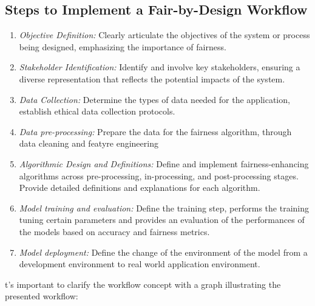 \subsection{Steps to Implement a Fair-by-Design Workflow}
\label{subsection:steps}

\begin{enumerate}

    \item \emph{Objective Definition:} Clearly articulate the objectives of the system or process being designed, emphasizing the importance of fairness.

    \item \emph{Stakeholder Identification:} Identify and involve key stakeholders, ensuring a diverse representation that reflects the potential impacts of the system.

    \item \emph{Data Collection:} Determine the types of data needed for the application, establish ethical data collection protocols.

    \item \emph{Data pre-processing:} Prepare the data for the fairness algorithm, through data cleaning and featyre engineering
    
    \item \emph{Algorithmic Design and Definitions:} Define and implement fairness-enhancing algorithms across pre-processing, in-processing, and post-processing stages. Provide detailed definitions and explanations for each algorithm.

    \item \emph{Model training and evaluation:} Define the training step, performs the training tuning certain parameters and provides an evaluation of the performances of the models based on accuracy and fairness metrics.

    \item \emph{Model deployment:} Define the change of the environment of the model from a development environment to real world application environment.

\end{enumerate}

t's important to clarify the workflow concept with a graph illustrating the presented workflow:

